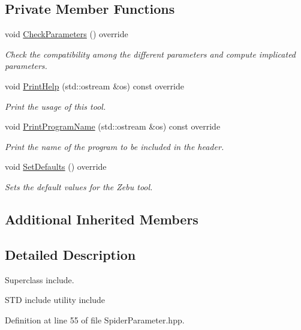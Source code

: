 \subsection*{Private Member Functions}
\begin{DoxyCompactItemize}
\item 
void \hyperlink{classSpiderParameter_a8e06c5f840c91a5207444d4f3fad6663}{Check\+Parameters} () override
\begin{DoxyCompactList}\small\item\em Check the compatibility among the different parameters and compute implicated parameters. \end{DoxyCompactList}\item 
void \hyperlink{classSpiderParameter_a8021f729e9e68cdacaa9ae2105b565ba}{Print\+Help} (std\+::ostream \&os) const override
\begin{DoxyCompactList}\small\item\em Print the usage of this tool. \end{DoxyCompactList}\item 
void \hyperlink{classSpiderParameter_a494cc1a863c33c3048b69969019fd6f9}{Print\+Program\+Name} (std\+::ostream \&os) const override
\begin{DoxyCompactList}\small\item\em Print the name of the program to be included in the header. \end{DoxyCompactList}\item 
void \hyperlink{classSpiderParameter_afbc320968099098b78d33aa2b36667c1}{Set\+Defaults} () override
\begin{DoxyCompactList}\small\item\em Sets the default values for the Zebu tool. \end{DoxyCompactList}\end{DoxyCompactItemize}
\subsection*{Additional Inherited Members}


\subsection{Detailed Description}
Superclass include. 

S\+TD include utility include 

Definition at line 55 of file Spider\+Parameter.\+hpp.




